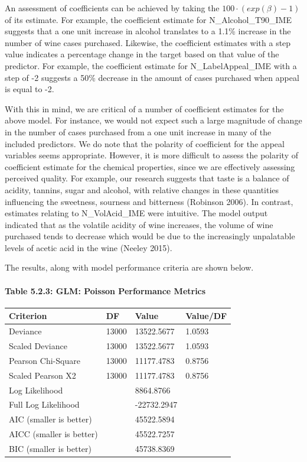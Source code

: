 \documentclass[]{article}
\let\oldparagraph\paragraph
\renewcommand{\paragraph}[1]{\oldparagraph{#1}\mbox{}}
\begin{document}
An assessment of coefficients can be achieved by taking the
\(100 \cdot (exp(\beta)-1)\) of its estimate. For example, the
coefficient estimate for N\_Alcohol\_T90\_IME suggests that a one unit
increase in alcohol translates to a 1.1\% increase in the number of wine
cases purchased. Likewise, the coefficient estimates with a step value
indicates a percentage change in the target based on that value of the
predictor. For example, the coefficient estimate for N\_LabelAppeal\_IME
with a step of -2 suggests a 50\% decrease in the amount of cases
purchased when appeal is equal to -2.

With this in mind, we are critical of a number of coefficient estimates
for the above model. For instance, we would not expect such a large
magnitude of change in the number of cases purchased from a one unit
increase in many of the included predictors. We do note that the
polarity of coefficient for the appeal variables seems appropriate.
However, it is more difficult to assess the polarity of coefficient
estimate for the chemical properties, since we are effectively assessing
perceived quality. For example, our research suggests that taste is a
balance of acidity, tannins, sugar and alcohol, with relative changes in
these quantities influencing the sweetness, sourness and bitterness
(Robinson 2006). In contrast, estimates relating to N\_VolAcid\_IME were
intuitive. The model output indicated that as the volatile acidity of
wine increases, the volume of wine purchased tends to decrease which
would be due to the increasingly unpalatable levels of acetic acid in
the wine (Neeley 2015).

The results, along with model performance criteria are shown below.

\paragraph{Table 5.2.3: GLM: Poisson Performance
Metrics}\label{table-5.2.3-glm-poisson-performance-metrics}

\begin{longtable}[]{@{}llll@{}}
\toprule
Criterion & DF & Value & Value/DF\tabularnewline
\midrule
\endhead
Deviance & 13000 & 13522.5677 & 1.0593\tabularnewline
Scaled Deviance & 13000 & 13522.5677 & 1.0593\tabularnewline
Pearson Chi-Square & 13000 & 11177.4783 & 0.8756\tabularnewline
Scaled Pearson X2 & 13000 & 11177.4783 & 0.8756\tabularnewline
Log Likelihood & & 8864.8766 &\tabularnewline
Full Log Likelihood & & -22732.2947 &\tabularnewline
AIC (smaller is better) & & 45522.5894 &\tabularnewline
AICC (smaller is better) & & 45522.7257 &\tabularnewline
BIC (smaller is better) & & 45738.8369 &\tabularnewline
\bottomrule
\end{longtable}
\end{document}
